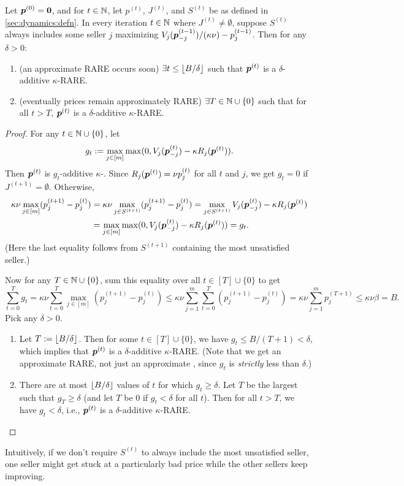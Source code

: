 \begin{theorem}
\label{thm:dynamics-convergence}
Let $\bm{p}^{(0)} = \mathbf{0}$, and for $t \in \mathbb{N}$, let $p^{(t)}$, $J^{(t)}$, and $S^{(t)}$
be as defined in \cref{sec:dynamics:defn}.
In every iteration $t \in \mathbb{N}$ where $J^{(t)} \neq \emptyset$, suppose $S^{(t)}$ always includes
some seller $j$ maximizing $V_j(\bm{p}^{(t-1)}_{-j})/(\kappa\nu) - p^{(t-1)}_j$.
Then for any $\delta > 0$:
\begin{enumerate}
\item (an approximate RARE occurs soon) $\exists t \le \lfloor B/\delta \rfloor$ such that
    $\bm{p}^{(t)}$ is a $\delta$-additive $\kappa$-RARE.
\item (eventually prices remain approximately RARE) $\exists T \in \mathbb{N} \cup \{0\}$ such that
    for all $t > T$, $\bm{p}^{(t)}$ is a $\delta$-additive $\kappa$-RARE.
\end{enumerate}
\end{theorem}
\begin{proof}
For any $t \in \mathbb{N} \cup \{0\}$, let
\[ g_t := \max_{j \in [m]} \max(0, V_j(\bm{p}^{(t)}_{-j}) - \kappa R_j(\bm{p}^{(t)})). \]
Then $\bm{p}^{(t)}$ is $g_t$-additive $\kappa$-\limRARE.
%
Since $R_j(\bm{p}^{(t)}) = \nu p^{(t)}_j$ for all $t$ and $j$,
we get $g_t = 0$ if $J^{(t+1)} = \emptyset$. Otherwise,
\begin{align*}
\kappa\nu \max_{j \in [m]} (p^{(t+1)}_j - p^{(t)}_j)
   &= \kappa\nu \max_{j \in S^{(t+1)}} (p^{(t+1)}_j - p^{(t)}_j)
    = \max_{j \in S^{(t+1)}} V_j(\bm{p}^{(t)}_{-j}) - \kappa R_j(\bm{p}^{(t)})
\\ &= \max_{j \in [m]} \max(0, V_j(\bm{p}^{(t)}_{-j}) - \kappa R_j(\bm{p}^{(t)}))
    = g_t.
\end{align*}
(Here the last equality follows from $S^{(t+1)}$ containing the most unsatisfied seller.)

Now for any $T \in \mathbb{N} \cup \{0\}$, sum this equality over all $t \in [T] \cup \{0\}$ to get
\[ \sum_{t=0}^T g_t = \kappa\nu \sum_{t=0}^T \max_{j \in [m]} (p^{(t+1)}_j - p^{(t)}_j)
    \le \kappa\nu \sum_{j=1}^m \sum_{t=0}^T (p^{(t+1)}_j - p^{(t)}_j)
    = \kappa\nu \sum_{j=1}^m p^{(T+1)}_j \le \kappa\nu\beta = B. \]
Pick any $\delta > 0$.
\begin{enumerate}
\item Let $T := \lfloor B/\delta \rfloor$. Then for some $t \in [T] \cup \{0\}$, we have
    $g_t \le B/(T+1) < \delta$, which implies that $\bm{p}^{(t)}$ is a $\delta$-additive $\kappa$-RARE.
    (Note that we get an approximate RARE, not just an approximate \limRARE{},
    since $g_t$ is \emph{strictly} less than $\delta$.)
\item There are at most $\lfloor B/\delta \rfloor$ values of $t$ for which $g_t \ge \delta$.
    Let $T$ be the largest such that $g_T \ge \delta$ (and let $T$ be 0 if $g_t < \delta$ for all $t$).
    Then for all $t > T$, we have $g_t < \delta$, i.e., $\bm{p}^{(t)}$ is a $\delta$-additive $\kappa$-RARE.
    \qedhere
\end{enumerate}
\end{proof}

Intuitively, if we don't require $S^{(t)}$ to always include the most unsatisfied seller,
one seller might get stuck at a particularly bad price while the other sellers keep improving.
